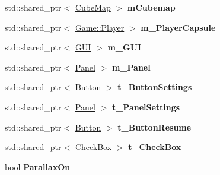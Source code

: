 \begin{DoxyCompactItemize}
\item 
std\+::shared\+\_\+ptr$<$ \hyperlink{class_cube_map}{Cube\+Map} $>$ {\bfseries m\+Cubemap}\hypertarget{class_epsilon_ae29db1c10e659d5ebf99daf105e4809a}{}\label{class_epsilon_ae29db1c10e659d5ebf99daf105e4809a}

\item 
std\+::shared\+\_\+ptr$<$ \hyperlink{class_game_1_1_player}{Game\+::\+Player} $>$ {\bfseries m\+\_\+\+Player\+Capsule}\hypertarget{class_epsilon_a04665a1bb5a68ad3ce58da699e950eea}{}\label{class_epsilon_a04665a1bb5a68ad3ce58da699e950eea}

\item 
std\+::shared\+\_\+ptr$<$ \hyperlink{class_g_u_i}{G\+UI} $>$ {\bfseries m\+\_\+\+G\+UI}\hypertarget{class_epsilon_ac1ee53302ebb2b523ab9ce9d5b4085f8}{}\label{class_epsilon_ac1ee53302ebb2b523ab9ce9d5b4085f8}

\item 
std\+::shared\+\_\+ptr$<$ \hyperlink{class_panel}{Panel} $>$ {\bfseries m\+\_\+\+Panel}\hypertarget{class_epsilon_af9eeb9bfc7070eba5e0825bb0944d988}{}\label{class_epsilon_af9eeb9bfc7070eba5e0825bb0944d988}

\item 
std\+::shared\+\_\+ptr$<$ \hyperlink{class_button}{Button} $>$ {\bfseries t\+\_\+\+Button\+Settings}\hypertarget{class_epsilon_ab51b2a5e32060866cfa88636462ff60d}{}\label{class_epsilon_ab51b2a5e32060866cfa88636462ff60d}

\item 
std\+::shared\+\_\+ptr$<$ \hyperlink{class_panel}{Panel} $>$ {\bfseries t\+\_\+\+Panel\+Settings}\hypertarget{class_epsilon_aa2d01a0159b159ecf687c8a60d2e4e2a}{}\label{class_epsilon_aa2d01a0159b159ecf687c8a60d2e4e2a}

\item 
std\+::shared\+\_\+ptr$<$ \hyperlink{class_button}{Button} $>$ {\bfseries t\+\_\+\+Button\+Resume}\hypertarget{class_epsilon_aa6e4dbd8843cad591be006b21a0bfbf9}{}\label{class_epsilon_aa6e4dbd8843cad591be006b21a0bfbf9}

\item 
std\+::shared\+\_\+ptr$<$ \hyperlink{class_check_box}{Check\+Box} $>$ {\bfseries t\+\_\+\+Check\+Box}\hypertarget{class_epsilon_abb0ca9300f46b775efaa57383970c95e}{}\label{class_epsilon_abb0ca9300f46b775efaa57383970c95e}

\item 
bool {\bfseries Parallax\+On}\hypertarget{class_epsilon_aba41d13e40c2dc8796dc7da8b72274f0}{}\label{class_epsilon_aba41d13e40c2dc8796dc7da8b72274f0}


\end{DoxyCompactItemize}
